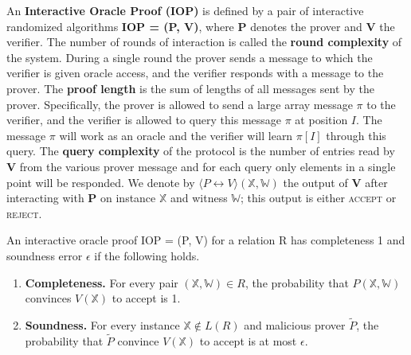 \begin{definition}
An \textbf{Interactive Oracle Proof (IOP)} is defined by a pair of interactive randomized
algorithms \textbf{IOP = (P, V)}, where \textbf{P} denotes the prover and \textbf{V} the verifier. 
The number of rounds of interaction is called the \textbf{round complexity} of the system. 
During a single round the prover sends a message to which the verifier is given oracle access, and the verifier responds with a message to the prover. 
The \textbf{proof length} is the sum of lengths of all messages sent by the prover. Specifically, the prover is allowed to send a large array message $\pi$ to the verifier, and the verifier is allowed to query this message $\pi$ at position $I$. The message $\pi$ will work as an oracle and the verifier will learn $\pi[I]$ through this query.
The \textbf{query complexity} of the protocol is the number of entries read by \textbf{V} from the various prover message and for each query only elements in a single point will be responded.
We denote by $\langle P \leftrightarrow V \rangle (\mathbb{X}, \mathbb{W})$ the output of \textbf{V} after interacting with \textbf{P} on instance $\mathbb{X}$ and witness $\mathbb{W}$; this output is either \textsc{accept} or \textsc{reject}.

An interactive oracle proof IOP = (P, V) for a relation R has completeness 1 and soundness error $\epsilon$ if the following holds.

\begin{enumerate}
    \item \textbf{Completeness.}
    For every pair $(\mathbb{X}, \mathbb{W}) \in R$, the probability that $P(\mathbb{X}, \mathbb{W})$ convinces $V(\mathbb{X})$ to accept is 1.
    
    \item \textbf{Soundness.}
    For every instance $\mathbb{X} \not\in L(R)$ and malicious prover $\tilde{P}$, the probability that $\tilde{P}$ convince $V(\mathbb{X})$ to accept is at most $\epsilon$.
\end{enumerate}
\end{definition}

